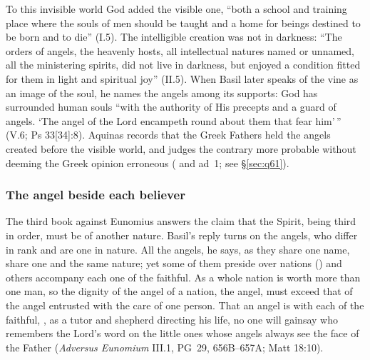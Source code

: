 \noindent To this invisible world God added the visible one, ``both a
school and training place where the souls of men should be taught and a
home for beings destined to be born and to die'' (I.5). The intelligible
creation was not in darkness: ``The orders of angels, the heavenly hosts,
all intellectual natures named or unnamed, all the ministering spirits,
did not live in darkness, but enjoyed a condition fitted for them in
light and spiritual joy'' (II.5). When Basil later speaks of the vine as
an image of the soul, he names the angels among its supports: God has
surrounded human souls ``with the authority of His precepts and a guard of
angels. `The angel of the Lord encampeth round about them that fear
him'\,'' (V.6; Ps 33[34]:8). Aquinas records that the Greek Fathers held
the angels created before the visible world, and judges the contrary more
probable without deeming the Greek opinion erroneous (
and ad~1; see \S\ref{sec:q61}).

\subsubsection{The angel beside each believer}

The third book against Eunomius answers the claim that the Spirit, being
third in order, must be of another nature. Basil's reply turns on the
angels, who differ in rank and are one in nature. All the angels, he
says, as they share one name, share one and the same nature; yet some of
them preside over nations () and others
accompany each one of the faithful. As a whole nation is worth more than
one man, so the dignity of the angel of a nation, the 
angel, must exceed that of the angel entrusted with the care of one
person. That an angel is with each of the faithful, , as a tutor and
shepherd directing his life, no one will gainsay who remembers the Lord's
word on the little ones whose angels always see the face of the Father
(\emph{Adversus Eunomium} III.1, PG~29, 656B--657A; Matt 18:10).

